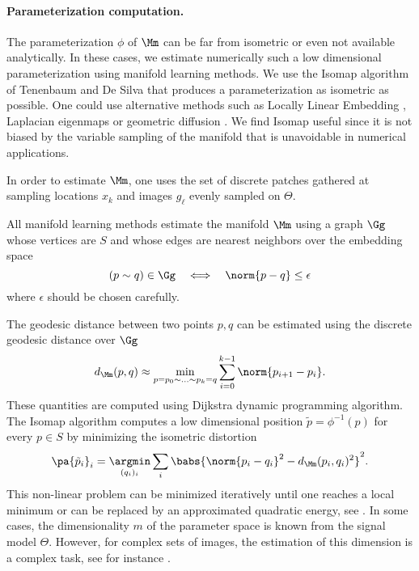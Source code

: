 \paragraph{Parameterization computation.}
The parameterization $\phi$ of $\Mm$ can be far from isometric or even not available analytically. In these cases, we estimate numerically such a low dimensional parameterization using manifold learning methods. We use the Isomap algorithm of Tenenbaum and De Silva \cite{tenenbaum-isomap} that produces a parameterization as isometric as possible. One could use alternative methods such as Locally Linear Embedding \cite{roweis-lle}, Laplacian eigenmaps \cite{belkin-laplacian-eigenmaps} or geometric diffusion \cite{coifman-geometric-diffusion}. We find Isomap useful since it is not biased by the variable sampling of the manifold that is unavoidable in numerical applications.

In order to estimate $\Mm$, one uses the set of discrete patches 
gathered at sampling locations $x_k$ and images $g_\ell$ evenly sampled on $\Theta$.

All manifold learning methods estimate the manifold $\Mm$ using a graph $\Gg$ whose vertices are $S$ and whose edges are nearest neighbors over the embedding space
\begin{equation*}
	(p \sim q) \in \Gg \quad \Longleftrightarrow \quad \norm{p-q} \leq \epsilon
\end{equation*}
where $\epsilon$ should be chosen carefully. 

The geodesic distance between two points $p,q$ can be estimated using the discrete geodesic distance over $\Gg$
\begin{equation*}
	d_{\Mm}(p,q) \approx \min_{p=p_0 \sim \ldots \sim p_k = q} \sum_{i=0}^{k-1} \norm{p_{i+1}-p_i}.
\end{equation*}
These quantities are computed using Dijkstra dynamic programming algorithm. The Isomap algorithm \cite{tenenbaum-isomap} computes a low dimensional position $\tilde p = \phi^{-1}(p)$ for every $p \in S$ by minimizing the isometric distortion
\begin{equation*}
	\pa{\tilde p_i}_{i} = 
	\underset{(q_i)_i}{\argmin} \sum_{i} \babs{ \norm{ p_i - q_i }^2 - d_{\Mm}(p_i,q_i)^2 }^2.
\end{equation*}
This non-linear problem can be minimized iteratively until one reaches a local minimum or can be replaced by an approximated quadratic energy, see \cite{tenenbaum-isomap}. In some cases, the dimensionality $m$ of the parameter space is known from the signal model $\Theta$. However, for complex sets of images, the estimation of this dimension is a complex task, see for instance \cite{camastra-dim-estimation,farahmand-manifold-adaptive}.

